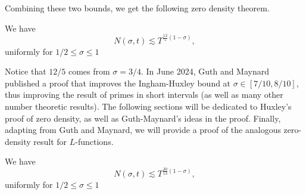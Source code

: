 Combining these two bounds, we get the following zero density theorem.
\begin{theorem}
   We have \[
    N(\sigma,t)\lesssim T^{\frac{12}{5}(1-\sigma)},
    \]
    uniformly for $1/2\leq \sigma\leq 1$
\end{theorem}
Notice that $12/5$ comes from $\sigma = 3/4$. In June 2024, Guth and Maynard published a proof that improves the Ingham-Huxley bound at $\sigma \in [7/10,8/10]$, thus improving the result of primes in short intervals (as well as many other number theoretic results). The following sections will be dedicated to Huxley's proof of zero density, as well as Guth-Maynard's ideas in the proof. Finally, adapting from Guth and Maynard, we will provide a proof of the analogous zero-density result for $L$-functions.
\begin{theorem}
    We have \[
     N(\sigma,t)\lesssim T^{\frac{30}{13}(1-\sigma)},
     \]
     uniformly for $1/2\leq \sigma\leq 1$
 \end{theorem}
